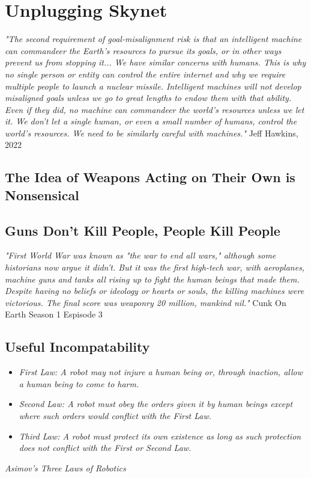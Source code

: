 \setchapterpreamble[u]{\margintoc}
\chapter{Unplugging Skynet}

\textit{"The second requirement of goal-misalignment risk is that an intelligent machine can commandeer the Earth's resources to pursue its goals, or in other ways prevent us from stopping it... We have similar concerns with humans. This is why no single person or entity can control the entire internet and why we require multiple people to launch a nuclear missile. Intelligent machines will not develop misaligned goals unless we go to great lengths to endow them with that ability. Even if they did, no machine can commandeer the world's resources unless we let it. We don't let a single human, or even a small number of humans, control the world's resources. We need to be similarly careful with machines."} Jeff Hawkins, 2022 \cite{hawkins2022}

\section{The Idea of Weapons Acting on Their Own is Nonsensical}

\section{Guns Don't Kill People, People Kill People}

\textit{"First World War was known as "the war to end all wars," although some historians now argue it didn't. But it was the first high-tech war, with aeroplanes, machine guns and tanks all rising up to fight the human beings that made them. Despite having no beliefs or ideology or hearts or souls, the killing machines were victorious. The final score was weaponry 20 million, mankind nil."} Cunk On Earth Season 1 Espisode 3 %

\section{Useful Incompatability}

\begin{itemize}
    \item\textit{First Law: A robot may not injure a human being or, through inaction, allow a human being to come to harm.}
    \item\textit{Second Law: A robot must obey the orders given it by human beings except where such orders would conflict with the First Law.}
    \item\textit{Third Law: A robot must protect its own existence as long as such protection does not conflict with the First or Second Law.}
\end{itemize} 
\textit{Asimov's Three Laws of Robotics}

